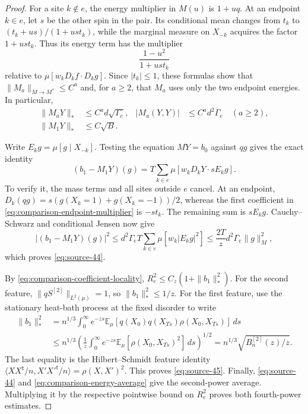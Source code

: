 \begin{proof}
For a site $k\notin e$, the energy multiplier in $M(u)$ is $1+uq$.
At an endpoint $k\in e$, let $s$ be the other spin in the pair.  Its
conditional mean changes from $t_k$ to
$(t_k+us)/(1+ust_k)$, while the marginal measure on $X_{-k}$ acquires
the factor $1+ust_k$.  Thus its energy term has the multiplier
\begin{equation}\label{eq:comparison-endpoint-multiplier}
 \frac{1-u^2}{1+ust_k}
\end{equation}
relative to $\mu[w_kD_kf\cdot D_kg]$.  Since $|t_k|\le1$, these formulas
show that $\|M_a\|_{M\to M^*}\le C^a$ and, for $a\ge2$, that $M_a$
uses only the two endpoint energies.  In particular,
\begin{equation}\label{eq:comparison-coefficient-locality}
 \begin{aligned}
 \|M_aY\|_*&\le C^a d\sqrt{\Gamma_e},&
 |M_a(Y,Y)|&\le C^a d^2\Gamma_e\quad(a\ge2),\\
 \|M_1Y\|_*&\le C\sqrt B.
 \end{aligned}
\end{equation}

Write $E_kg=\mu[g\mid X_{-k}]$.  Testing the equation $MY=b_0$ against
$qg$ gives the exact identity
\begin{equation}\label{eq:comparison-residual-identity}
 (b_1-M_1Y)(g)
  =T\sum_{k\in e}\mu[w_kD_kY\cdot sE_kg].
\end{equation}
To verify it, the mass terms and all sites outside $e$ cancel.  At an endpoint,
$D_k(qg)=s(g(X_k=1)+g(X_k=-1))/2$, whereas the first coefficient in
\eqref{eq:comparison-endpoint-multiplier} is $-st_k$.  The remaining sum is
$sE_kg$.  Cauchy--Schwarz and conditional Jensen now give
\[
 |(b_1-M_1Y)(g)|^2
 \le d^2\Gamma_e T\sum_{k\in e}\mu[w_k|E_kg|^2]
 \le\frac{2T}{z}d^2\Gamma_e\|g\|_M^2,
\]
which proves \eqref{eq:source-44}.

By \eqref{eq:comparison-coefficient-locality},
$R_e^2\le C_z(1+\|b_1\|_*^2)$.  For the second feature,
$\|qS^{[2]}\|_{L^2(\mu)}=1$, so $\|b_1\|_*^2\le1/z$.
For the first feature, use the stationary heat-bath process at the fixed
disorder to write
\begin{align*}
 \|b_1\|_*^2
 &=n^{1/3}\int_0^\infty e^{-zs}
   \mathbb E_\mu\!\left[
      q(X_0)q(X_{Ts})\rho(X_0,X_{Ts})\right]\,ds\\
 &\le n^{1/3}\left(\frac1z
      \int_0^\infty e^{-zs}
          \mathbb E_\mu[\rho(X_0,X_{Ts})^2]\,ds\right)^{1/2}
  =n^{1/3}\sqrt{B_n^{[2]}(z)/z}.
\end{align*}
The last equality is the Hilbert--Schmidt feature identity
$\langle XX^{\mathsf t}/n,X'X'^{\mathsf t}/n\rangle=\rho(X,X')^2$.
This proves \eqref{eq:source-45}.  Finally,
\eqref{eq:source-44} and \eqref{eq:comparison-energy-average} give the
second-power average.  Multiplying it by the respective pointwise bound on
$R_e^2$ proves both fourth-power estimates.
\end{proof}

